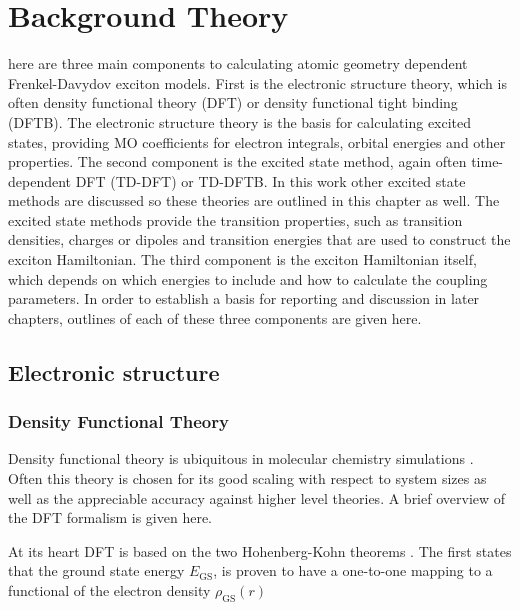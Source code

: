 %
%
\let\textcircled=\pgftextcircled
\chapter{Background Theory}
\label{chap:background_theory}

here are three main components to calculating atomic geometry dependent
Frenkel-Davydov exciton models. First is the electronic structure theory, which 
is often density functional theory (DFT) or density functional tight binding (DFTB).
The electronic structure theory is the basis for calculating excited states, providing
MO coefficients for electron integrals, orbital energies and other properties. The 
second component is the excited state method, again often time-dependent DFT (TD-DFT)
or TD-DFTB. In this work other excited state methods are discussed so these theories 
are outlined in this chapter as well. The excited state methods provide the transition 
properties, such as transition densities, charges or dipoles and transition energies 
that are used to construct the exciton Hamiltonian. The third component is the exciton 
Hamiltonian itself, which depends on which energies to include and how to calculate 
the coupling parameters. In order to establish a basis for reporting and discussion 
in later chapters, outlines of each of these three components are given here.

\section{Electronic structure}
\label{sec:electronic_structure}

\subsection{Density Functional Theory}
\label{subsec:dft}

Density functional theory is ubiquitous in molecular chemistry simulations \cite{Maitra2016}.
Often this theory is chosen for its good scaling with respect to system sizes as 
well as the appreciable accuracy against higher level theories. A brief overview
of the DFT formalism is given here.

At its heart DFT is based on the two Hohenberg-Kohn theorems \cite{Kohn1964}. The
first states that the ground state energy $E_{\text{GS}}$, is proven to have a one-to-one
mapping to a functional of the electron density $\rho_{\text{GS}} \left(r\right)$

